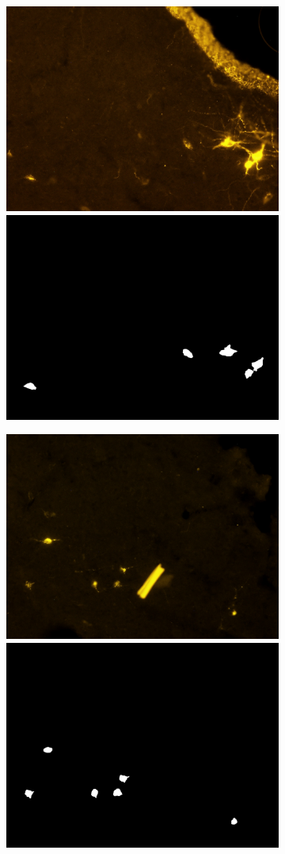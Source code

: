 \begin{figure}
\centering
\begin{subfigure}{1.1\textwidth}
\includegraphics[width=0.5\linewidth]{figures/120_dataset/i_252.jpeg}
\includegraphics[width=0.5\linewidth]{figures/120_dataset/m_252.jpeg}
\subcaption{}
\label{fig:artifacts:stripe}
\end{subfigure}
\centering
\begin{subfigure}{1.1\textwidth}
\includegraphics[width=0.5\linewidth]{figures/120_dataset/i_maccherone.jpeg}
\includegraphics[width=0.5\linewidth]{figures/120_dataset/m_maccherone.png}
\subcaption{}

\end{subfigure}
\end{figure}
